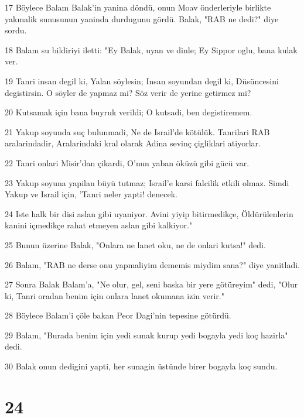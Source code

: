 \par 17 Böylece Balam Balak'in yanina döndü, onun Moav önderleriyle birlikte yakmalik sunusunun yaninda durdugunu gördü. Balak, "RAB ne dedi?" diye sordu.
\par 18 Balam su bildiriyi iletti: "Ey Balak, uyan ve dinle; Ey Sippor oglu, bana kulak ver.
\par 19 Tanri insan degil ki, Yalan söylesin; Insan soyundan degil ki, Düsüncesini degistirsin. O söyler de yapmaz mi? Söz verir de yerine getirmez mi?
\par 20 Kutsamak için bana buyruk verildi; O kutsadi, ben degistiremem.
\par 21 Yakup soyunda suç bulunmadi, Ne de Israil'de kötülük. Tanrilari RAB aralarindadir, Aralarindaki kral olarak Adina sevinç çigliklari atiyorlar.
\par 22 Tanri onlari Misir'dan çikardi, O'nun yaban öküzü gibi gücü var.
\par 23 Yakup soyuna yapilan büyü tutmaz; Israil'e karsi falcilik etkili olmaz. Simdi Yakup ve Israil için, 'Tanri neler yapti! denecek.
\par 24 Iste halk bir disi aslan gibi uyaniyor. Avini yiyip bitirmedikçe, Öldürülenlerin kanini içmedikçe rahat etmeyen aslan gibi kalkiyor."
\par 25 Bunun üzerine Balak, "Onlara ne lanet oku, ne de onlari kutsa!" dedi.
\par 26 Balam, "RAB ne derse onu yapmaliyim dememis miydim sana?" diye yanitladi.
\par 27 Sonra Balak Balam'a, "Ne olur, gel, seni baska bir yere götüreyim" dedi, "Olur ki, Tanri oradan benim için onlara lanet okumana izin verir."
\par 28 Böylece Balam'i çöle bakan Peor Dagi'nin tepesine götürdü.
\par 29 Balam, "Burada benim için yedi sunak kurup yedi bogayla yedi koç hazirla" dedi.
\par 30 Balak onun dedigini yapti, her sunagin üstünde birer bogayla koç sundu.

\chapter{24}

